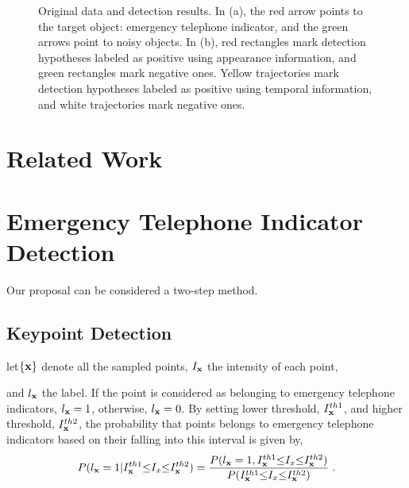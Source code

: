 \documentclass{JoITSRstyle}
\begin{document}
\begin{figure}
\centering
{}
\caption{Original data and detection results. In (a), the red arrow points to the target object: emergency telephone indicator, and the green arrows point to noisy objects. In (b), red rectangles mark detection hypotheses labeled as positive using appearance information, and green rectangles mark negative ones. Yellow trajectories mark detection hypotheses labeled as positive using temporal information, and white trajectories mark negative ones.}
\label{fig:first}
\end{figure}











\section{Related Work}




\section{Emergency Telephone Indicator Detection}
Our proposal can be considered a two-step method. 

\subsection{Keypoint Detection}



let$\{\bf{x}\}$ denote all the sampled points, $I_{\bf{x}}$ the intensity of each point, \begin{comment}$I_{\bf{x}}\sim{\mathcal{N}(\mu_{I_{\bf{x}}},{\sigma_{I_{\bf{x}}}}^2)}$,
\end{comment}
and $l_{\bf{x}}$ the label. If the point is considered as belonging to emergency telephone indicators, $l_{\bf{x}}=1$, otherwise, $l_{\bf{x}}=0$. By setting lower threshold, $I^{th1}_{\bf{x}}$,  and higher threshold, $I^{th2}_{\bf{x}}$, the probability that points belongs to emergency telephone indicators based on their falling into this interval is given by,
\begin{equation}
P(l_{\bf{x}}=1|I^{th1}_{\bf{x}}{\leq}I_x{\leq}{I^{th2}_{\bf{x}}})=
\frac
{P(l_{\bf{x}}=1,I^{th1}_{\bf{x}}{\leq}I_x{\leq}{I^{th2}_{\bf{x}}})} {P(I^{th1}_{\bf{x}}{\leq}I_x{\leq}{I^{th2}_{\bf{x}}})}\;.
\label{eq1}
\end{equation}
\end{document}
